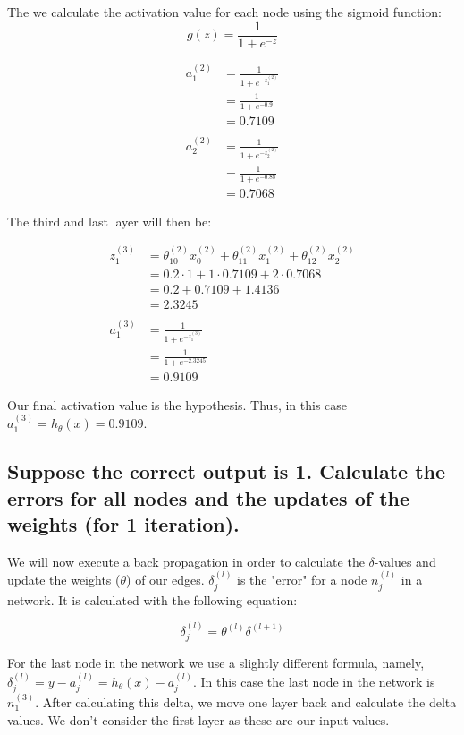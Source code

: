 \documentclass{article}
\begin{document}
The we calculate the activation value for each node using the sigmoid function:
\begin{equation*}
g(z) = \frac{1}{1 + e^{-z}}
\end{equation*}

\begin{align*}
a^{(2)}_1 &= \frac{1}{1 + e^{-z^{(2)}_1}} \\
&=  \frac{1}{1 + e^{-0.9}} \\
&= 0.7109 \\
\\
a^{(2)}_2 &= \frac{1}{1 + e^{-z^{(2)}_2}} \\
&=  \frac{1}{1 + e^{-0.88}} \\
&= 0.7068
\end{align*}

\pagebreak

The third and last layer will then be:

\begin{align*}
z^{(3)}_1 &= \theta_{10}^{(2)}x_0^{(2)} +  \theta_{11}^{(2)}x_1^{(2)} +  \theta_{12}^{(2)}x_2^{(2)} \\
&=0.2 \cdot 1 + 1 \cdot 0.7109 + 2 \cdot 0.7068 \\
&= 0.2 + 0.7109 + 1.4136 \\
&= 2.3245 \\
\\
a^{(3)}_1 &= \frac{1}{1 + e^{-z^{(3)}_1}} \\
&=  \frac{1}{1 + e^{-2.3245}} \\
&= 0.9109
\end{align*}

Our final activation value is the hypothesis. Thus, in this case  $a^{(3)}_1  = h_\theta(x) = 0.9109$. 

\subsection{Suppose the correct output is 1. Calculate the errors for all nodes and the updates of the
weights (for 1 iteration).}
We will now execute a back propagation in order to calculate the $\delta$-values and update the weights ($\theta$) of our edges. 
$\delta_j^{(l)}$ is the "error" for a node $n_j^{(l)}$ in a network. It is calculated with the following equation:

\begin{equation*}
\delta_j^{(l)}  = \theta^{(l)} \delta^{(l+1)}
\end{equation*}

For the last node in the network we use a slightly different formula, namely, $\delta_j^{(l)} = y - a_j^{(l)} = h_\theta(x) - a_j^{(l)}$. In this case the last node in the network is $n_1^{(3)}$. After calculating this delta, we move one layer back and calculate the delta values. We don't consider the first layer as these are our input values. 
\end{document}
